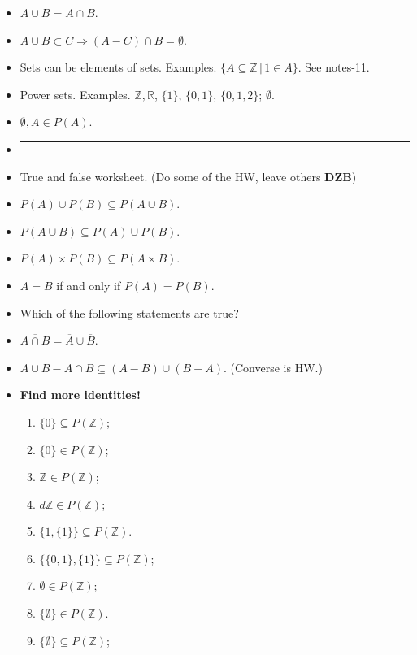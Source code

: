 \documentclass[12pt]{article}
\newcommand{\Z}{{\mathbb Z}}
\newcommand{\R}{{\mathbb R}}
\begin{document}
\begin{itemize}
\item $\overline{A \cup B} = \overline{A} \cap \overline{B}$.
\item $A \cup B \subset C \Rightarrow (A - C) \cap B = \emptyset$.

\item Sets can be elements of sets. Examples. $\{A \subseteq \mathbb{Z} \,|\, 1 \in A\}$. See notes-11.
\item Power sets. Examples. $\Z, \R$, $\{1\}$, $\{0,1\}$, $\{0,1,2\}$; $\emptyset$. 
\item $\emptyset, A \in P(A)$.
\item []       \vspace{0.1cm}\hrule\vspace{-0.4cm}    
\item True and false worksheet. (Do some of the HW, leave others \textbf{DZB})
 \item $P(A) \cup P(B) \subseteq P(A \cup B)$.
 \item $P(A \cup B) \subseteq P(A) \cup P(B)$.
 \item $P(A) \times P(B) \subseteq P(A \times B)$.
 \item $A = B$ if and only if $P(A) = P(B)$.
\item  Which of the following statements are true?
\item $\overline{A \cap B} = \overline{A} \cup \overline{B}$.
\item $A \cup B - A \cap B \subseteq (A - B) \cup (B - A)$. (Converse is HW.)
\item \textbf{Find more identities!}

  
  \begin{enumerate}
 \item $\{0\} \subseteq P(\mathbb{Z})$;\vspace{0.3cm}    
 \item $\{0\} \in P(\mathbb{Z})$;\vspace{0.3cm}
 \item $\mathbb{Z} \in P(\mathbb{Z})$;\vspace{0.3cm}
 \item $d\mathbb{Z} \in P(\mathbb{Z})$;\vspace{0.3cm}   
 \item $\{1,\{1\}\} \subseteq P(\mathbb{Z})$.\\ 
 \item $\{\{0,1\},\{1\}\} \subseteq P(\mathbb{Z})$;\vspace{0.3cm}
 \item $\emptyset \in P(\mathbb{Z})$;\vspace{0.3cm}
 \item $\{\emptyset\} \in P(\mathbb{Z})$. \vspace{0.3cm}
 \item $\{\emptyset\} \subseteq P(\mathbb{Z})$;\vspace{0.3cm}


\end{enumerate}
\end{itemize}
\end{document}
